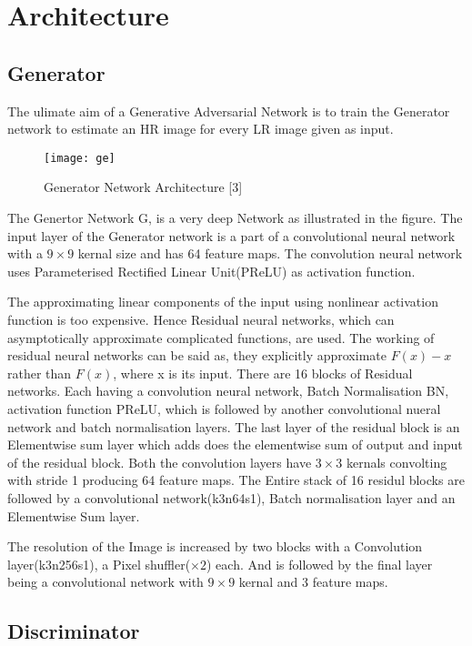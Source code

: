 

\section{Architecture}

\subsection{Generator}

The ulimate aim of a Generative Adversarial Network is to train the Generator network to estimate an HR image for every LR image given as input.


\begin{figure}[h]
\texttt{[image: ge]}
\caption{Generator Network Architecture [3]}
\end{figure}


The Genertor Network G, is a very deep Network as illustrated in the figure. The input layer of the Generator network is a part of a convolutional neural network with a $9\times 9$ kernal size and has 64 feature maps. The convolution neural network uses Parameterised Rectified Linear Unit(PReLU) as activation function. 

The approximating linear components of the input using nonlinear activation function is too expensive. Hence Residual neural networks, which can asymptotically approximate complicated functions, are used. The working of residual neural networks can be said as, they explicitly approximate $F(x)-x$ rather than $F(x)$, where x is its input. There are 16 blocks of Residual networks. Each having a convolution neural network, Batch Normalisation BN, activation function PReLU, which is followed by another convolutional nueral network and batch normalisation layers. The last layer of the residual block is an Elementwise sum layer which adds does the elementwise sum of output and input of the residual block. Both the convolution layers have $3\times 3$ kernals convolting with stride 1 producing 64 feature maps. The Entire stack of 16 residul blocks are followed by a convolutional network(k3n64s1), Batch normalisation layer and an Elementwise Sum layer. 

The resolution of the Image is increased by two blocks with a Convolution layer(k3n256s1), a Pixel shuffler($\times 2$) each. And is followed by the final layer  
being a convolutional network with $ 9\times 9 $ kernal and 3 feature maps.

\subsection{Discriminator}


